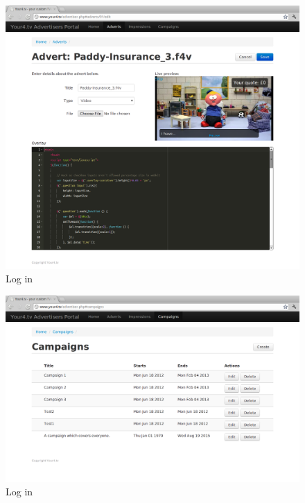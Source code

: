 \begin{figure}[th]
	\centering
	\includegraphics[width=\textwidth]{images/screenshots/advertiser-advert-edit.png}
	\caption{Log in}
	\label{fig:advertiser-advert-edit}
\end{figure}
\begin{figure}[th]
	\centering
	\includegraphics[width=\textwidth]{images/screenshots/advertiser-campaigns.png}
	\caption{Log in}
	\label{fig:advertiser-campaigns}
\end{figure}
